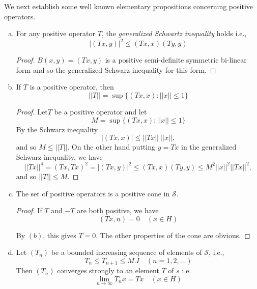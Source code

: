 We next establish some well known elementary propositions concerning
positive operators. 
\begin{enumerate}[(a)]
\item For any positive operator $T$, the \textit{generalized Schwartz
  inequality} holds i.e., 
  $$
  |(Tx,y)|^2 \leq (Tx,x) (Ty,y)
  $$

  \begin{proof}
    $B(x,y)= (Tx,y)$ is a positive semi-definite symmetric bi-linear
    form and so the generalized Schwarz inequality for this form. 
  \end{proof}

\item If $T$ is a positive operator, then
  $$
  || T || = \sup \{(Tx,x): || x|| \leq 1 \}
  $$

  \begin{proof}
    Let\pageoriginale $T$ be a positive operator and let
    $$
    M =\sup \{(Tx,x) : || x || \leq 1 \}
    $$
    By the Schwarz inequality
    $$
    | (Tx,x)| \leq || Tx|| ~ ||x||,
    $$
    and so $M \leq || T||$. On the other hand putting $y=Tx$ in the
    generalized Schwarz inequality, we have 
    $$
    ||Tx ||^4 =(Tx,Tx)^2 = |(Tx,y)|^2 \leq (Tx,x)(Ty,y) \leq M^2 ||
    x||^2 ||Tx||^2, 
    $$
    and so $|| T|| \leq M$.
  \end{proof}

\item The set of positive operators is a positive cone in
  $\mathscr{S}$.

  \begin{proof}
    If $T$ and $-T$ are both positive, we have
    $$
    (Tx,n) = 0 \quad (x \in H)
    $$
    
    By $(b)$, this gives $T =0$. The other properties of the cone are obvious. 
  \end{proof}

\item Let $(T_n)$ be a bounded increasing sequence of elements of
  $\mathscr{S}$, i.e., 
  $$
  T_n \leq T_{n+1} \leq M.I \quad (n=1,2,\ldots)
  $$
  Then $(T_n)$ converges strongly to an element $T$ of $s$ i.e.
  $$
  \lim_{n \to \infty} T_n x = Tx \quad (x \in H)
  $$
\end{enumerate}

